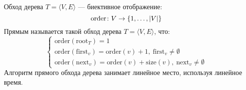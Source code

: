 {\ital Обход} дерева $T=\langle V,E\rangle$ --- биективное отображение:
$$\text{order}\colon V\to\{1,\dots,\left|V\right|\}$$
{\ital Прямым} называется такой обход дерева $T=\langle V,E\rangle$, что:
$$\begin{cases}
\text{order}(\text{root}_T)=1\\
\text{order}(\text{first}_v)=\text{order}(v)+1,\ \text{first}_v\neq\emptyset\\
\text{order}(\text{next}_v)=\text{order}(v)+\text{size}(v),\ \text{next}_v\neq\emptyset
\end{cases}$$
Алгоритм прямого обхода дерева занимает линейное место, используя линейное время.
